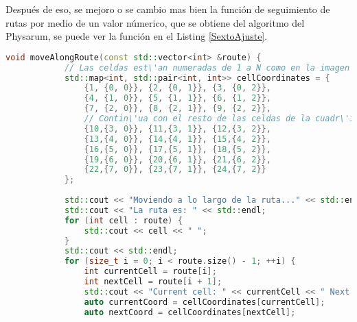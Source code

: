    Despu\'es de eso, se mejoro o se cambio mas bien la funci\'on de seguimiento de rutas por medio de 
        un valor n\'umerico, que se obtiene del algoritmo del Physarum, se puede ver la funci\'on 
        en el Listing \ref{SextoAjuste}.
    \begin{lstlisting}[language={C++}, caption={Sexto ajuste de c\'odigo}, label={SextoAjuste}]
        void moveAlongRoute(const std::vector<int> &route) {
            // Las celdas est\'an numeradas de 1 a N como en la imagen proporcionada.
            std::map<int, std::pair<int, int>> cellCoordinates = {
                {1, {0, 0}}, {2, {0, 1}}, {3, {0, 2}},
                {4, {1, 0}}, {5, {1, 1}}, {6, {1, 2}},
                {7, {2, 0}}, {8, {2, 1}}, {9, {2, 2}},
                // Contin\'ua con el resto de las celdas de la cuadr\'icula...
                {10,{3, 0}}, {11,{3, 1}}, {12,{3, 2}},
                {13,{4, 0}}, {14,{4, 1}}, {15,{4, 2}},
                {16,{5, 0}}, {17,{5, 1}}, {18,{5, 2}},
                {19,{6, 0}}, {20,{6, 1}}, {21,{6, 2}},
                {22,{7, 0}}, {23,{7, 1}}, {24,{7, 2}}
            };
        
            std::cout << "Moviendo a lo largo de la ruta..." << std::endl;
            std::cout << "La ruta es: " << std::endl;
            for (int cell : route) {
                std::cout << cell << " ";
            }
            std::cout << std::endl;
            for (size_t i = 0; i < route.size() - 1; ++i) {
                int currentCell = route[i];
                int nextCell = route[i + 1];
                std::cout << "Current cell: " << currentCell << " Next cell: " << nextCell << endl;
                auto currentCoord = cellCoordinates[currentCell];
                auto nextCoord = cellCoordinates[nextCell];
        

\end{lstlisting}
